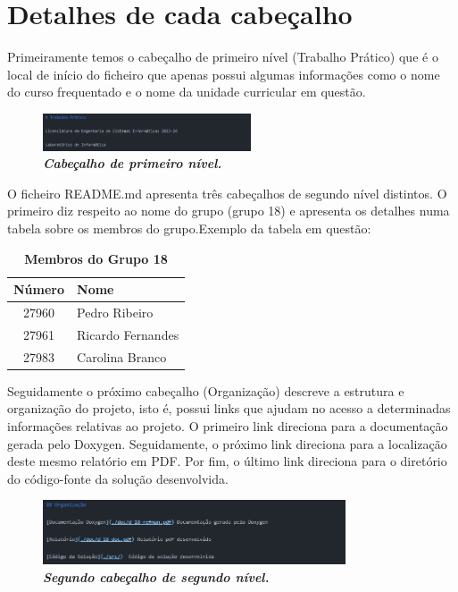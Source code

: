 \documentclass[a4wide]{report}
\begin{document}
{{{{\newpage
\section{Detalhes de cada cabeçalho}
\Large
Primeiramente temos o cabeçalho de primeiro nível (Trabalho Prático) que é o local de início do ficheiro que apenas possui algumas informações como o nome do curso frequentado e o nome da unidade curricular em questão. 

\begin{figure}[hbt]
    \centering
    \includegraphics[width=0.55\textwidth]{figura1.png}
    \caption{\textbf{\textit{Cabeçalho de primeiro nível.}}\label{fig:imagem}}
\end{figure}

O ficheiro README.md apresenta três cabeçalhos de segundo nível distintos. O primeiro diz respeito ao nome do grupo (grupo 18) e apresenta os detalhes numa tabela sobre os membros do grupo.Exemplo da tabela em questão: 

\begin{table}[h]
\centering
\begin{tabular}{|c|l|}
\hline
\textbf{Número} & \textbf{Nome}          \\ \hline
27960           & Pedro Ribeiro          \\ \hline
27961           & Ricardo Fernandes     \\ \hline
27983           & Carolina Branco       \\ \hline
\end{tabular}
\caption{\textbf{Membros do Grupo 18}\label{tab:grupo18}}
\end{table}


Seguidamente o próximo cabeçalho (Organização) descreve a estrutura e organização do projeto, isto é, possui links que ajudam no acesso a determinadas informações relativas ao projeto. O primeiro link direciona para a documentação gerada pelo Doxygen. Seguidamente, o próximo link direciona para a localização deste mesmo relatório em PDF. Por fim, o último link direciona para o diretório do código-fonte da solução desenvolvida. 

\begin{figure}[hbt]
    \centering
    \includegraphics[width=0.80\textwidth]{figura3.png}
    \caption{\textbf{\textit{Segundo cabeçalho de segundo nível.}}\label{fig:imagem}}
\end{figure}

}}}}
\end{document}
